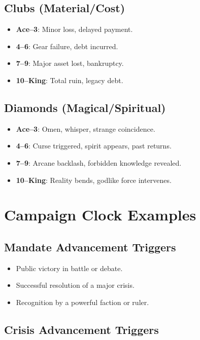 \subsection*{Clubs (Material/Cost)}

\begin{itemize}
    \item \textbf{Ace--3}: Minor loss, delayed payment.
    \item \textbf{4--6}: Gear failure, debt incurred.
    \item \textbf{7--9}: Major asset lost, bankruptcy.
    \item \textbf{10--King}: Total ruin, legacy debt.
\end{itemize}

\subsection*{Diamonds (Magical/Spiritual)}

\begin{itemize}
    \item \textbf{Ace--3}: Omen, whisper, strange coincidence.
    \item \textbf{4--6}: Curse triggered, spirit appears, past returns.
    \item \textbf{7--9}: Arcane backlash, forbidden knowledge revealed.
    \item \textbf{10--King}: Reality bends, godlike force intervenes.
\end{itemize}

\section*{Campaign Clock Examples}

\subsection*{Mandate Advancement Triggers}

\begin{itemize}
    \item Public victory in battle or debate.
    \item Successful resolution of a major crisis.
    \item Recognition by a powerful faction or ruler.
\end{itemize}

\subsection*{Crisis Advancement Triggers}

